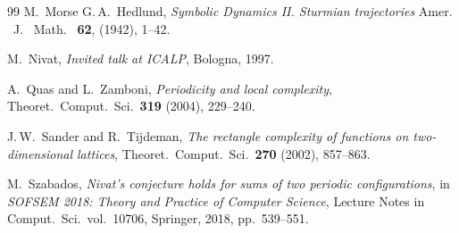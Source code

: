 \documentclass[12pt]{amsart}
\numberwithin{equation}{section}
\begin{document}
\begin{thebibliography}{99}
 M.~Morse G.\,A.~Hedlund, \textit{Symbolic Dynamics II. Sturmian trajectories} 
  Amer. \ J. \ Math. \ {\bf 62}, (1942), 1--42.

  M.~Nivat,
  \textit{Invited talk at ICALP},
  Bologna, 1997.

  A.~Quas and L.~Zamboni,
  \textit{Periodicity and local complexity},
  Theoret.\ Comput.\ Sci.\ \textbf{319} (2004), 229--240.

  J.\,W.~Sander and R.~Tijdeman,
  \textit{The rectangle complexity of functions on two-dimensional
  lattices},
  Theoret.\ Comput.\ Sci.\ \textbf{270} (2002), 857--863.

  M.~Szabados,
  \textit{Nivat's conjecture holds for sums of two periodic
  configurations},
  in \textit{SOFSEM 2018: Theory and Practice of Computer Science},
  Lecture Notes in Comput.\ Sci.\ vol.\ 10706, Springer, 2018,
  pp.~539--551.
  
\end{thebibliography}
\end{document}
